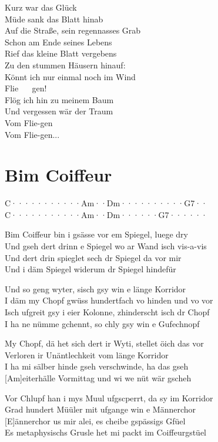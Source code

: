 \documentclass[
  letterpaper,
  twoside=false]{scrbook}
\begin{document}
Kurz war das Glück\\
Müde sank das Blatt hinab\\
Auf die Straße, sein regennasses Grab\\
Schon am Ende seines Lebens\\
Rief das kleine Blatt vergebens\\
Zu den stummen Häusern hinauf:\\
Könnt ich nur einmal noch im Wind\\
Flie ~ ~gen!\\
Flög ich hin zu meinem Baum\\
Und vergessen wär der Traum\\
Vom Flie-gen\\
Vom Flie-gen...

\hypertarget{bim-coiffeur}{%
\chapter{Bim Coiffeur}\label{bim-coiffeur}}

\textbar C·······\textbar····Am··\textbar Dm······\textbar····G7··\textbar{}\\
\textbar C·······\textbar····Am··\textbar Dm······\textbar G7······\textbar{}

Bim Coiffeur bin i gsässe vor em Spiegel, luege dry\\
Und gseh dert drinn e Spiegel wo ar Wand isch vis-a-vis\\
Und dert drin spieglet sech dr Spiegel da vor mir\\
Und i däm Spiegel widerum dr Spiegel hindefür

Und so geng wyter, s\textquotesingle isch gsy win e länge Korridor\\
I däm my Chopf gwüss hundertfach vo hinden und vo vor\\
Isch ufgreit gsy i eier Kolonne, z\textquotesingle hinderscht isch dr
Chopf\\
I ha ne nümme gchennt, so chly gsy win e Gufechnopf

My Chopf, dä het sich dert ir Wyti, stellet öich das vor\\
Verloren ir Unäntlechkeit vom länge Korridor\\
I ha mi sälber hinde gseh verschwinde, ha das gseh\\
{[}Am{]}eiterhälle Vormittag und wi we nüt wär gscheh

Vor Chlupf han i mys Muul ufgscperrt, da sy im Korridor\\
Grad hundert Müüler mit ufgange win e Männerchor\\
{[}E{]}ännerchor us mir alei, es cheibe gspässigs Gfüel\\
Es metaphysischs Grusle het mi packt im Coiffeurgstüel
\end{document}
